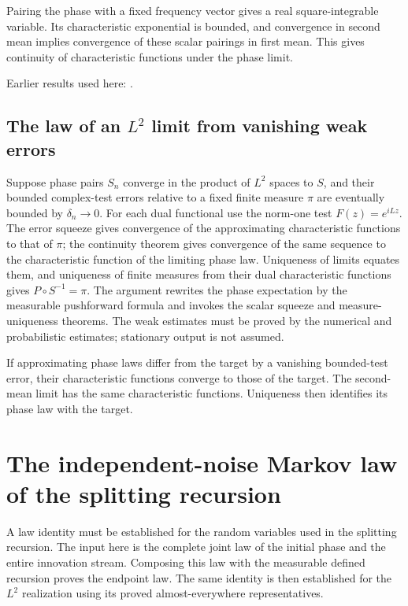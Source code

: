 \documentclass[11pt,a4paper]{report}
\begin{document}
Pairing the phase with a fixed frequency vector gives a real square-integrable variable. Its characteristic exponential is bounded, and convergence in second mean implies convergence of these scalar pairings in first mean. This gives continuity of characteristic functions under the phase limit.



Earlier results used here: \cite[Section~3.5.7]{LangevinLean2026ULASC}.
\subsection{\texorpdfstring{The law of an \(L^{2}\) limit from vanishing weak errors}{The law of an L² limit from vanishing weak errors}}
\label{report-step-KineticLangevin-LpPhaseLaw-lean-3}


Suppose phase pairs \(S_n\) converge in the product of \(L^{2}\) spaces to \(S\), and their bounded complex-test errors relative to a fixed finite measure \(\pi\) are eventually bounded by \(\delta_n\to0\). For each dual functional use the norm-one test \(F(z)=e^{iLz}\). The error squeeze gives convergence of the approximating characteristic functions to that of \(\pi\); the continuity theorem gives convergence of the same sequence to the characteristic function of the limiting phase law. Uniqueness of limits equates them, and uniqueness of finite measures from their dual characteristic functions gives \(P\circ S^{-1}=\pi\). The argument rewrites the phase expectation by the measurable pushforward formula and invokes the scalar squeeze and measure-uniqueness theorems. The weak estimates must be proved by the numerical and probabilistic estimates; stationary output is not assumed.



If approximating phase laws differ from the target by a vanishing bounded-test error, their characteristic functions converge to those of the target. The second-mean limit has the same characteristic functions. Uniqueness then identifies its phase law with the target.

\section{\texorpdfstring{The independent-noise Markov law of the splitting recursion}{The independent-noise Markov law of the splitting recursion}}
\label{proof-module-KineticLangevin-SplittingLaw-lean}


A law identity must be established for the random variables used in the splitting recursion. The input here is the complete joint law of the initial phase and the entire innovation stream. Composing this law with the measurable defined recursion proves the endpoint law. The same identity is then established for the \(L^{2}\) realization using its proved almost-everywhere representatives.
\end{document}
